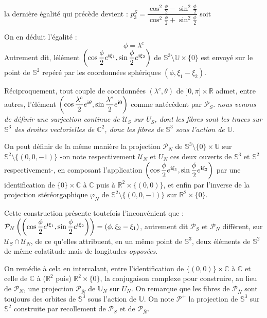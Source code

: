 la derni\`ere \'egalit\'e qui pr\'ec\`ede devient : %
$p_3^S=\dfrac{\cos^2 \frac{\phi}{2}-\sin^2\frac{\phi}{2}}{\cos^2\frac{\phi}{2}+\sin^2 \frac{\phi}{2}}$ soit 
\par
On en d\'eduit l'\'egalit\'e : \[\phi=\lambda^c\]
Autrement dit, l\'el\'ement $\left(\cos\dfrac{\phi}{2}e^{\mathbf{i}\xi_1},\sin\dfrac{\phi}{2}e^{\mathbf{i}\xi_2}\right)$ de $\mathbb{S}^3\setminus\mathbb{U}\times\{0\}$ est envoy\'e sur le point de $\mathbb{S}^2$ rep\'er\'e par les coordonn\'ees sph\'eriques $(\phi,\xi_1-\xi_2)$.
\par
R\'eciproquement, tout couple de coordonn\'ees $(\lambda^c,\theta)$ de $]0,\pi]\times\mathbb{R}$ admet, entre autres, l'\'el\'ement $\left(\cos\dfrac{\lambda^c}{2}e^{\mathbf{i}\theta},\sin\dfrac{\lambda^c}{2}e^{\mathbf{i}0}\right)$ %
comme ant\'ec\'edent par $\mathcal{P}_S$. \emph{nous venons de d\'efinir une surjection continue de $\mathcal{U}_S$ sur $U_S$, %
dont les fibres sont les traces sur $\mathbb{S}^3$ des droites vectorielles de $\mathbb{C}^2$, donc les fibres de $\mathbb{S}^3$ sous l'action de $\mathbb{U}$.}
\par
On peut d\'efinir de la m\^eme mani\`ere la projection $\mathcal{P}_N$ de $\mathbb{S}^3\setminus\{0\}\times\mathbb{U}$ sur $\mathbb{S}^2\setminus\{(0,0,-1)\}$ %
-on note respectivement $\mathcal{U}_N$ et $U_N$ ces deux ouverts de $\mathbb{S}^3$ et $\mathbb{S}^2$ respectivement-, %
en composant l'application $\left(\cos\dfrac{\phi}{2}e^{\mathbf{i}\xi_1},\sin\dfrac{\phi}{2}e^{\mathbf{i}\xi_2}\right)$ par une identification de $\{0\}\times\mathbb{C}$ \`a $\mathbb{C}$ puis \`a $\mathbb{R}^2\times\{(0,0)\}$, %
et enfin par l'inverse de la projection st\'er\'eorgaphique $\varphi_N$ de $\mathbb{S}^2\setminus\{(0,0,-1)\}$ sur $\mathbb{R}^2\times\{0\}$.
\par
Cette construction pr\'esente toutefois l'inconv\'enient que : $\mathcal{P}_N\left(\left(\cos\dfrac{\phi}{2}e^{\mathbf{i}\xi_1},\sin\dfrac{\phi}{2}e^{\mathbf{i}\xi_2}\right)\right)=(\phi ,\xi_2-\xi_1)$, %
autrement dit $\mathcal{P}_S$ et $\mathcal{P}_N$ diff\`erent, sur $\mathcal{U}_S\cap\mathcal{U}_N$, de ce qu'elles attribuent, en un m\^eme point de $\mathbb{S}^3$, %
deux \'el\'ements de $\mathbb{S}^2$ de m\^eme colatitude mais de longitudes \emph{oppos\'ees}.
\par
On rem\'edie \`a cela en intercalant, entre l'identification de $\{(0,0)\}\times\mathbb{C}$ \`a $\mathbb{C}$ et celle de $\mathbb{C}$ \`a ($\mathbb{R}^2$ puis) $\mathbb{R}^2\times\{0\}$, %
la conjugaison complexe pour construire, au lieu de $\mathcal{P}_N$, une projection $\mathcal{P}_{\overline{N}}$ de $\mathbb{U}_N$ sur $U_N$. %
On remarque que les fibres de $\mathcal{P}_{\overline{N}}$ sont toujours des orbites de $\mathbb{S}^3$ sous l'action de $\mathbb{U}$.
\ligneinter
On note $\mathcal{P}^+$ la projection de $\mathbb{S}^3$ sur $\mathbb{S}^2$ construite par recollement de $\mathcal{P}_S$ et de $\mathcal{P}_{\overline{N}}$. %
